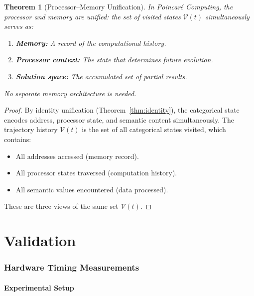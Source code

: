 \documentclass[twocolumn,10pt,a4paper]{article}
\theoremstyle{plain}
\newtheorem{theorem}{Theorem}[section]
\theoremstyle{definition}
\theoremstyle{remark}
\begin{document}
\begin{theorem}[Processor--Memory Unification]
\label{thm:proc_mem}
In Poincar\'{e} Computing, the processor and memory are unified: the set of visited states $\mathcal{V}(t)$ simultaneously serves as:
\begin{enumerate}
    \item \textbf{Memory:} A record of the computational history.
    \item \textbf{Processor context:} The state that determines future evolution.
    \item \textbf{Solution space:} The accumulated set of partial results.
\end{enumerate}
No separate memory architecture is needed.
\end{theorem}

\begin{proof}
By identity unification (Theorem~\ref{thm:identity}), the categorical state encodes address, processor state, and semantic content simultaneously. The trajectory history $\mathcal{V}(t)$ is the set of all categorical states visited, which contains:
\begin{itemize}
    \item All addresses accessed (memory record).
    \item All processor states traversed (computation history).
    \item All semantic values encountered (data processed).
\end{itemize}
These are three views of the same set $\mathcal{V}(t)$.
\end{proof}


\part{Validation}
\label{part:validation}

\section{Hardware Timing Measurements}
\label{sec:hardware}

\subsection{Experimental Setup}
\end{document}
